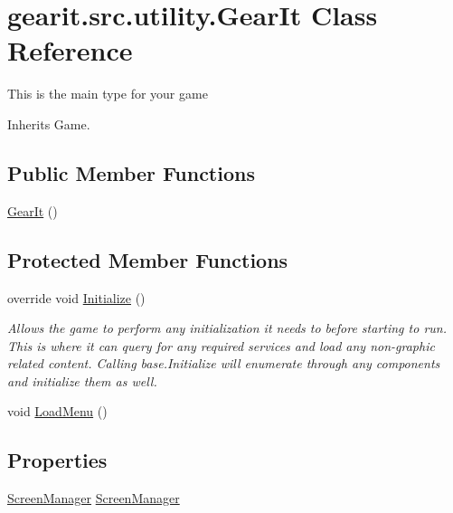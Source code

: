 \hypertarget{classgearit_1_1src_1_1utility_1_1_gear_it}{\section{gearit.\+src.\+utility.\+Gear\+It Class Reference}
\label{classgearit_1_1src_1_1utility_1_1_gear_it}
}


This is the main type for your game  




Inherits Game.

\subsection*{Public Member Functions}
\begin{DoxyCompactItemize}
\item 
\hyperlink{classgearit_1_1src_1_1utility_1_1_gear_it_a404d7ace42e029814283ceee913dcc42}{Gear\+It} ()
\end{DoxyCompactItemize}
\subsection*{Protected Member Functions}
\begin{DoxyCompactItemize}
\item 
override void \hyperlink{classgearit_1_1src_1_1utility_1_1_gear_it_a41848ae97fed17e2c9b5eeea2a9db3ac}{Initialize} ()
\begin{DoxyCompactList}\small\item\em Allows the game to perform any initialization it needs to before starting to run. This is where it can query for any required services and load any non-\/graphic related content. Calling base.\+Initialize will enumerate through any components and initialize them as well. \end{DoxyCompactList}\item 
void \hyperlink{classgearit_1_1src_1_1utility_1_1_gear_it_a785a846968232f4e18578d650d0215a8}{Load\+Menu} ()
\end{DoxyCompactItemize}
\subsection*{Properties}
\begin{DoxyCompactItemize}
\item 
\hyperlink{classgearit_1_1xna_1_1_screen_manager}{Screen\+Manager} \hyperlink{classgearit_1_1src_1_1utility_1_1_gear_it_afc56ffffdfa33fabe7a22aa5f8b0537b}{Screen\+Manager}
\end{DoxyCompactItemize}


